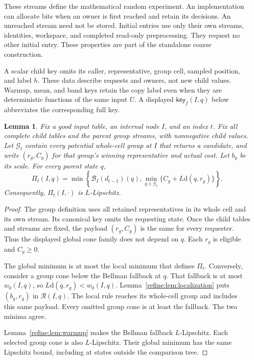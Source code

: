 \documentclass[11pt]{article}
\newcommand{\wedkey}[2]{\mathsf{key}_{#1}(#2)}
\newtheorem{lemma}[theorem]{Lemma}
\theoremstyle{definition}
\newcommand{\dd}{\mathrm d}
\newcommand{\cB}{\mathcal B}
\newcommand{\1}{\mathbf 1}
\begin{document}
These streams define the mathematical random experiment. An implementation
can allocate bits when an owner is first reached and retain its decisions.
An unreached stream need not be stored. Initial entries use only their
own streams, identities, workspace, and completed read-only preprocessing.
They request no other initial entry. These properties are part of the
standalone coarse construction.

A scalar child key omits its caller, representative, group cell, sampled
position, and label $h$. These data describe requests and owners, not new
child values. Warmup, mean, and band keys retain the copy label even when
they are deterministic functions of the same input $U$. A displayed
$\wedkey{f}{I,q}$ below abbreviates the corresponding full key.



\begin{lemma}\label{refine:lem:group-cones}
Fix a good input table, an internal node $I$, and an index $t$.
Fix all complete child tables and the parent group streams, with
nonnegative child values. Let $\mathcal G_t$ contain every potential
whole-cell group at $I$ that returns a candidate, and write $(r_g,C_g)$
for that group's winning representative and actual cost.
Let $b_g$ be its scale.
For every parent state $q$,
\[
 \Pi_t(I,q)=\min\left\{
 \cB_I(d_{t-1})(q),
 \min_{g\in\mathcal G_t}\{C_g+L\dd(q,r_g)\}
 \right\}.
\]
Consequently, $\Pi_t(I,\cdot)$ is $L$-Lipschitz.
\end{lemma}
\begin{proof}
The group definition uses all retained representatives in its whole
cell and its own stream. Its canonical key omits the requesting state.
Once the child tables and streams are fixed, the payload $(r_g,C_g)$
is the same for every requester. Thus the displayed global cone family
does not depend on $q$. Each $r_g$ is eligible and $C_g\ge0$.

The global minimum is at most the local minimum that defines $\Pi_t$.
Conversely, consider a group cone below the Bellman fallback at $q$.
That fallback is at most $w_0(I,q)$, so
$L\dd(q,r_g)<w_0(I,q)$.
Lemma~\ref{refine:lem:localization} puts $(b_g,r_g)$ in
$\mathcal R(I,q)$. The local rule reaches its whole-cell group and
includes this same payload. Every omitted group cone
is at least the fallback. The two minima agree.

Lemma~\ref{refine:lem:warmup} makes the Bellman fallback $L$-Lipschitz.
Each selected group cone is also $L$-Lipschitz. Their global minimum
has the same Lipschitz bound, including at states outside the
comparison tree.
\end{proof}
\end{document}
